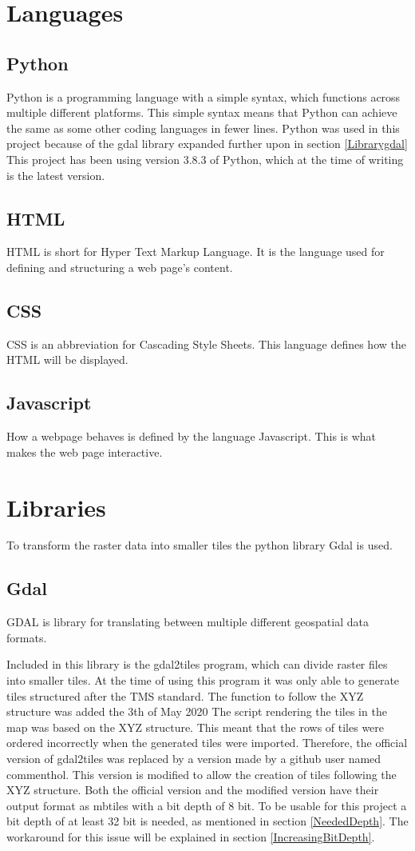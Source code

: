 \section{Languages}
\subsection*{Python}
Python is a programming language with a simple syntax, which functions across multiple different platforms. This simple syntax means that Python can achieve the same as some other coding languages in fewer lines.\citep{WhatIsPython}
Python was used in this project because of the gdal library expanded further upon in section \ref{Librarygdal}
This project has been using version 3.8.3 of Python, which at the time of writing is the latest version. \citep{PythonVersion}
\subsection*{HTML}
HTML is short for Hyper Text Markup Language. It is the language used for defining and structuring a web page’s content.
\subsection*{CSS}
CSS is an abbreviation for Cascading Style Sheets. This language defines how the HTML will be displayed.
\subsection*{Javascript}
How a webpage behaves is defined by the language Javascript.  This is what makes the web page interactive. 
\citep{WhatIsJs}

\section{Libraries}
To transform the raster data into smaller tiles the python library Gdal is used. 
\subsection*{Gdal}\label{Librarygdal}
GDAL is library for translating between multiple different geospatial data formats. \citep{GDAL} 

Included in this library is the gdal2tiles program, which can divide raster files into smaller tiles. 
At the time of using this program it was only able to generate tiles structured after the TMS standard. The function to follow the XYZ structure was added the 3th of May 2020 \citep{gdal2tilesDoc} \citep{GdalRelease}
%
The script rendering the tiles in the map was based on the XYZ structure. This meant that the rows of tiles were ordered incorrectly when the generated tiles were imported. Therefore, the official version of gdal2tiles was replaced by a version made by a github user named commenthol. This version is modified to allow the creation of tiles following the XYZ structure. \citep{gdalLeaflet}
Both the official version and the modified version have their output format as mbtiles with a bit depth of 8 bit. To be usable for this project a bit depth of at least 32 bit is needed, as mentioned in section \ref{NeededDepth}. The workaround for this issue will be explained in section \ref{IncreasingBitDepth}. 

